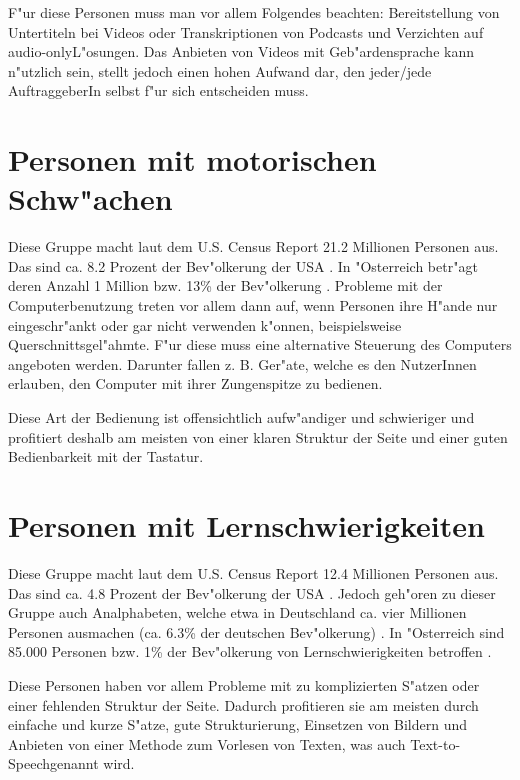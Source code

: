 \documentclass[a4paper,bibtotoc,oneside]{scrbook}
\begin{document}
F"ur diese Personen muss man vor allem Folgendes beachten: Bereitstellung von Untertiteln bei Videos oder Transkriptionen von Podcasts und Verzichten auf \glqq audio-only\grqq L"osungen. Das Anbieten von Videos mit Geb"ardensprache kann n"utzlich sein, stellt jedoch einen hohen Aufwand dar, den jeder/jede AuftraggeberIn selbst f"ur sich entscheiden muss. \cite[S. 17]{barr_webd}\cite[S. 20]{understand_acc}

\section{Personen mit motorischen Schw"achen}
Diese Gruppe macht laut dem U.S. Census Report 21.2 Millionen Personen aus. Das
sind ca. 8.2 Prozent der Bev"olkerung der USA \cite[S. 1]{us_cens}. In "Osterreich betr"agt deren Anzahl 1 Million bzw. 13\% der Bev"olkerung \cite[S. 12]{stat_austria}. Probleme mit der Computerbenutzung treten vor allem dann auf, wenn Personen ihre H"ande nur eingeschr"ankt oder gar nicht verwenden k"onnen, beispielsweise Querschnittsgel"ahmte. F"ur diese muss eine alternative Steuerung des Computers angeboten werden. Darunter fallen z. B. Ger"ate, welche es den NutzerInnen erlauben, den Computer mit ihrer Zungenspitze zu bedienen.\cite[S. 15-16]{barr_webd}

Diese Art der Bedienung ist offensichtlich aufw"andiger und schwieriger und profitiert deshalb am meisten von einer klaren Struktur der Seite und einer guten Bedienbarkeit mit der Tastatur.\cite[S. 15-16]{barr_webd}\cite[S. 18]{understand_acc}

\section{Personen mit Lernschwierigkeiten}
Diese Gruppe macht laut dem U.S. Census Report 12.4 Millionen Personen aus. Das
sind ca. 4.8 Prozent der Bev"olkerung der USA \cite[S. 1]{us_cens}. Jedoch geh"oren zu dieser Gruppe auch Analphabeten, welche etwa in Deutschland ca. vier Millionen Personen ausmachen (ca. 6.3\% der deutschen Bev"olkerung) \cite[S. 19]{understand_acc}. In "Osterreich sind 85.000 Personen bzw. 1\% der Bev"olkerung von Lernschwierigkeiten betroffen \cite[S. 14]{stat_austria}.

Diese Personen haben vor allem Probleme mit zu komplizierten S"atzen oder einer fehlenden Struktur der Seite. Dadurch profitieren sie am meisten durch einfache und kurze S"atze, gute Strukturierung, Einsetzen von Bildern und Anbieten von einer Methode zum Vorlesen von Texten, was auch \glqq Text-to-Speech\grqq genannt wird. \cite[S. 18-19]{barr_webd}\cite[S. 19]{understand_acc}
\end{document}
